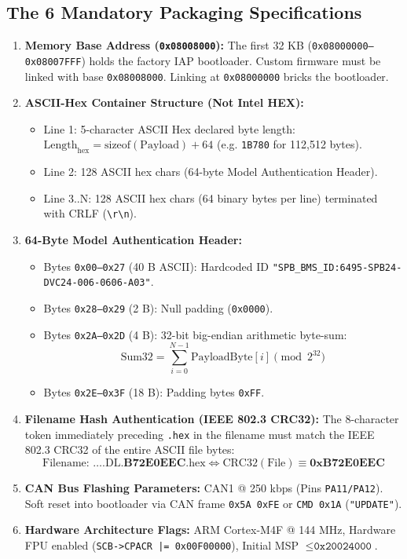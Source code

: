 \documentclass[10pt,a4paper]{article}
\begin{document}
\subsection{The 6 Mandatory Packaging Specifications}
\begin{enumerate}
    \item \textbf{Memory Base Address (\texttt{0x08008000}):} The first 32 KB (\texttt{0x08000000--0x08007FFF}) holds the factory IAP bootloader. Custom firmware must be linked with base \texttt{0x08008000}. Linking at \texttt{0x08000000} bricks the bootloader.
    \item \textbf{ASCII-Hex Container Structure (Not Intel HEX):}
    \begin{itemize}
        \item Line 1: 5-character ASCII Hex declared byte length: $\text{Length}_{\text{hex}} = \text{sizeof}(\text{Payload}) + 64$ (e.g. \texttt{1B780} for 112,512 bytes).
        \item Line 2: 128 ASCII hex chars (64-byte Model Authentication Header).
        \item Line 3..N: 128 ASCII hex chars (64 binary bytes per line) terminated with CRLF (\texttt{\textbackslash r\textbackslash n}).
    \end{itemize}
    \item \textbf{64-Byte Model Authentication Header:}
    \begin{itemize}
        \item Bytes \texttt{0x00--0x27} (40 B ASCII): Hardcoded ID \texttt{"SPB\_BMS\_ID:6495-SPB24-DVC24-006-0606-A03"}.
        \item Bytes \texttt{0x28--0x29} (2 B): Null padding (\texttt{0x0000}).
        \item Bytes \texttt{0x2A--0x2D} (4 B): 32-bit big-endian arithmetic byte-sum:
        \begin{equation}
            \text{Sum32} = \sum_{i=0}^{N-1} \text{PayloadByte}[i] \pmod{2^{32}}
        \end{equation}
        \item Bytes \texttt{0x2E--0x3F} (18 B): Padding bytes \texttt{0xFF}.
    \end{itemize}
    \item \textbf{Filename Hash Authentication (IEEE 802.3 CRC32):} The 8-character token immediately preceding \texttt{.hex} in the filename must match the IEEE 802.3 CRC32 of the entire ASCII file bytes:
    \begin{equation}
        \text{Filename: } \dots\text{.DL.}\mathbf{B72E0EEC}\text{.hex} \iff \text{CRC32}(\text{File}) \equiv \mathbf{0xB72E0EEC}
    \end{equation}
    \item \textbf{CAN Bus Flashing Parameters:} CAN1 @ 250 kbps (Pins \texttt{PA11/PA12}). Soft reset into bootloader via CAN frame \texttt{0x5A 0xFE} or \texttt{CMD 0x1A} (\texttt{"UPDATE"}).
    \item \textbf{Hardware Architecture Flags:} ARM Cortex-M4F @ 144 MHz, Hardware FPU enabled (\texttt{SCB->CPACR |= 0x00F00000}), Initial MSP $\le \texttt{0x20024000}$.
\end{enumerate}
\end{document}

